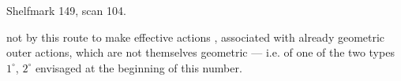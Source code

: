 Shelfmark 149, scan 104.

not by this route to make effective actions , associated with  already geometric outer actions, which are not themselves geometric --- i.e. of one of the two types $1^\circ$, $2^\circ$ envisaged at the beginning of this number.
